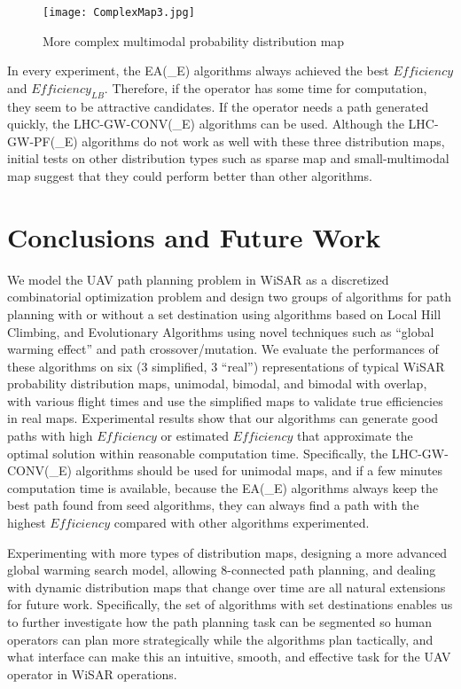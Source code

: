 \begin{figure}
\centering
\texttt{[image: ComplexMap3.jpg]}
\caption{More complex multimodal probability distribution map}
\label{ComplexMap}
\end{figure}

In every experiment, the EA(\_E) algorithms always achieved the best $\mathit{Efficiency}$ and $\mathit{Efficiency_{LB}}$. Therefore, if the operator has some time for computation, they seem to be attractive candidates. If the operator needs a path generated quickly, the LHC-GW-CONV(\_E) algorithms can be used. Although the LHC-GW-PF(\_E) algorithms do not work as well with these three distribution maps, initial tests on other distribution types such as sparse map and small-multimodal map suggest that they could perform better than other algorithms.


\section{Conclusions and Future Work}

We model the UAV path planning problem in WiSAR as a discretized combinatorial optimization problem and design two groups of algorithms for path planning with or without a set destination using algorithms based on Local Hill Climbing, and Evolutionary Algorithms using novel techniques such as ``global warming effect'' and path crossover/mutation. We evaluate the performances of these algorithms on six (3 simplified, 3 ``real'') representations of typical WiSAR probability distribution maps, unimodal, bimodal, and bimodal with overlap, with various flight times and use the simplified maps to validate true efficiencies in real maps. Experimental results show that our algorithms can generate good paths with high $\mathit{Efficiency}$ or estimated $\mathit{Efficiency}$ that approximate the optimal solution within reasonable computation time. Specifically, the LHC-GW-CONV(\_E) algorithms should be used for unimodal maps, and if a few minutes computation time is available, because the EA(\_E) algorithms always keep the best path found from seed algorithms, they can always find a path with the highest $\mathit{Efficiency}$ compared with other algorithms experimented.

Experimenting with more types of distribution maps, designing a more advanced global warming search model, allowing 8-connected path planning, and dealing with dynamic distribution maps that change over time are all natural extensions for future work. Specifically, the set of algorithms with set destinations enables us to further investigate how the path planning task can be segmented so human operators can plan more strategically while the algorithms plan tactically, and what interface can make this an intuitive, smooth, and effective task for the UAV operator in WiSAR operations.
